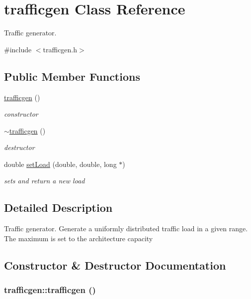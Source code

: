 \hypertarget{classtrafficgen}{
\section{trafficgen Class Reference}
\label{classtrafficgen}
}


Traffic generator.  




{\ttfamily \#include $<$trafficgen.h$>$}

\subsection*{Public Member Functions}
\begin{DoxyCompactItemize}
\item 
\hyperlink{classtrafficgen_a5dff07c6da8f8b999ddaea3f66f35f97}{trafficgen} ()
\begin{DoxyCompactList}\small\item\em constructor \item\end{DoxyCompactList}\item 
\hyperlink{classtrafficgen_ac354957233749112711e372977013674}{$\sim$trafficgen} ()
\begin{DoxyCompactList}\small\item\em destructor \item\end{DoxyCompactList}\item 
double \hyperlink{classtrafficgen_ab91f6ea4b48657844b9c925d3d1c8466}{setLoad} (double, double, long $\ast$)
\begin{DoxyCompactList}\small\item\em sets and return a new load \item\end{DoxyCompactList}\end{DoxyCompactItemize}


\subsection{Detailed Description}
Traffic generator. Generate a uniformly distributed traffic load in a given range. The maximum is set to the architecture capacity 

\subsection{Constructor \& Destructor Documentation}
\hypertarget{classtrafficgen_a5dff07c6da8f8b999ddaea3f66f35f97}{
\subsubsection[{trafficgen}]{\setlength{\rightskip}{0pt plus 5cm}trafficgen::trafficgen ()}}
\label{classtrafficgen_a5dff07c6da8f8b999ddaea3f66f35f97}



